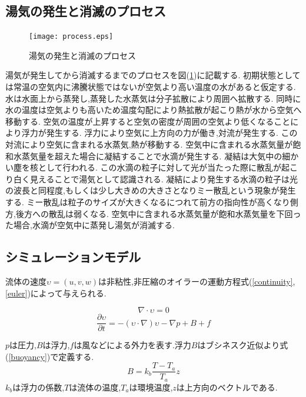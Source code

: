 \documentclass[submit,techrep]{ipsj}
\begin{document}
\subsection{湯気の発生と消滅のプロセス}
\begin{figure}[h]
\centering
\texttt{[image: process.eps]}
\caption{湯気の発生と消滅のプロセス}
\label{process}
\end{figure}
湯気が発生してから消滅するまでのプロセスを図(\ref{process})に記載する.	
初期状態としては常温の空気内に沸騰状態ではないが空気より高い温度の水があると仮定する.
水は水面上から蒸発し,蒸発した水蒸気は分子拡散により周囲へ拡散する.
同時に水の温度は空気よりも高いため温度勾配により熱拡散が起こり熱が水から空気へ移動する.
空気の温度が上昇すると空気の密度が周囲の空気より低くなることにより浮力が発生する.
浮力により空気に上方向の力が働き,対流が発生する.
この対流により空気に含まれる水蒸気,熱が移動する.
空気中に含まれる水蒸気量が飽和水蒸気量を超えた場合に凝結することで水滴が発生する.
凝結は大気中の細かい塵を核として行われる.
この水滴の粒子に対して光が当たった際に散乱が起こり白く見えることで湯気として認識される.
凝結により発生する水滴の粒子は光の波長と同程度,もしくは少し大きめの大きさとなりミー散乱という現象が発生する.
ミー散乱は粒子のサイズが大きくなるにつれて前方の指向性が高くなり側方,後方への散乱は弱くなる.
空気中に含まれる水蒸気量が飽和水蒸気量を下回った場合,水滴が空気中に蒸発し湯気が消滅する.

\subsection{シミュレーションモデル}

流体の速度$\upsilon=(u,v,w)$は非粘性,非圧縮のオイラーの運動方程式(\ref{continuity},\ref{euler})によって与えられる.

\begin{equation}
\label{continuity}
\nabla \cdot \upsilon = 0
\end{equation}
\begin{equation}
\label{euler}
\frac{\partial \upsilon}{\partial t} = -(\upsilon \cdot \nabla)\upsilon - \nabla p + B + f
\end{equation}

$p$は圧力,$B$は浮力,$f$は風などによる外力を表す.浮力$B$はブシネスク近似より式(\ref{buoyancy})で定義する.
\begin{equation}
\label{buoyancy}
B=k_{b}\frac{T-T_{a}}{T_{a}}z
\end{equation}
$k_{b}$は浮力の係数,$T$は流体の温度,$T_{a}$は環境温度,$z$は上方向のベクトルである.
\end{document}

